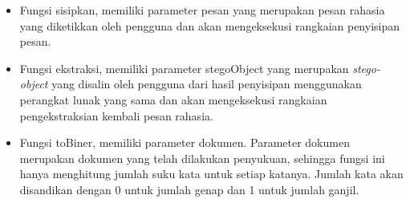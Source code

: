 \begin{enumerate}
\begin{itemize}
		\item Fungsi sisipkan, memiliki parameter pesan yang merupakan pesan rahasia yang diketikkan oleh pengguna dan akan mengeksekusi rangkaian penyisipan pesan.
		\item Fungsi ekstraksi, memiliki parameter stegoObject yang merupakan \textit{stego-object} yang disalin oleh pengguna dari hasil penyisipan menggunakan perangkat lunak yang sama dan akan mengeksekusi rangkaian pengekstraksian kembali pesan rahasia.
		\item Fungsi toBiner, memiliki parameter dokumen. Parameter dokumen merupakan dokumen yang telah dilakukan penyukuan, sehingga fungsi ini hanya menghitung jumlah suku kata untuk setiap katanya. Jumlah kata akan disandikan dengan 0 untuk jumlah genap dan 1 untuk jumlah ganjil.
	\end{itemize}
\end{enumerate}